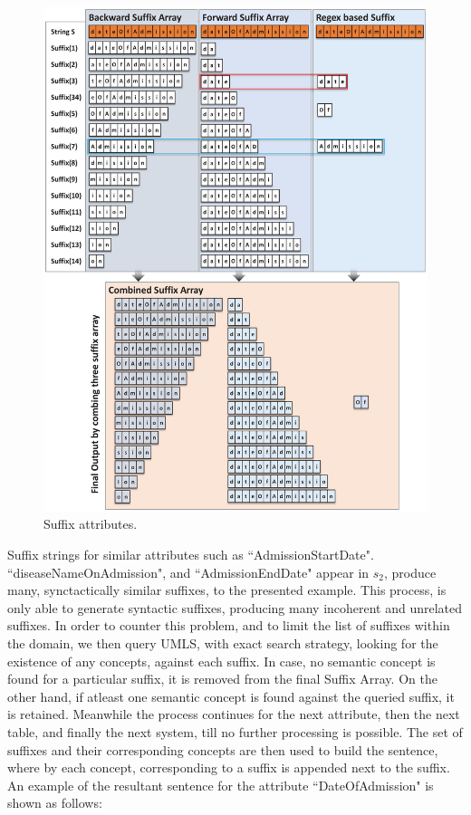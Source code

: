\documentclass{ieeeaccess}
\begin{document}
\begin{figure}[t!]
	\centering
	\includegraphics[scale=0.53]{suffixAttribute}
	\caption{Suffix attributes.}
	\label{fig:suffix_attribute}
\end{figure}

Suffix strings for similar attributes such as ``AdmissionStartDate". ``diseaseNameOnAdmission", and ``AdmissionEndDate" appear in $s_2$, produce many, synctactically similar suffixes, to the presented example. This process, is only able to generate syntactic suffixes, producing many incoherent and unrelated suffixes. In order to counter this problem, and to limit the list of suffixes within the domain, we then query UMLS, with exact search strategy, looking for the existence of any concepts, against each suffix. In case, no semantic concept is found for a particular suffix, it is removed from the final Suffix Array. On the other hand, if atleast one semantic concept is found against the queried suffix, it is retained. Meanwhile the process continues for the next attribute, then the next table, and finally the next system, till no further processing is possible. 
The set of suffixes and their corresponding concepts are then used to build the sentence, where by each concept, corresponding to a suffix is appended next to the suffix. An example of the resultant sentence for the attribute ``DateOfAdmission" is shown as follows:\\
\end{document}
